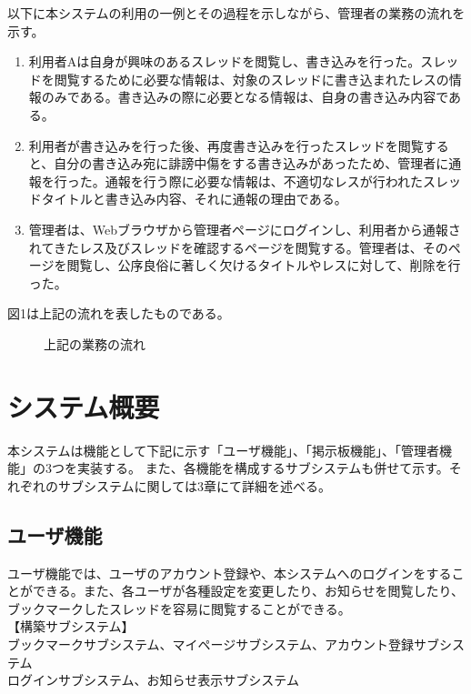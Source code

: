 \documentclass[a4j]{jarticle}
\begin{document}
以下に本システムの利用の一例とその過程を示しながら、管理者の業務の流れを示す。

\begin{enumerate}
  \item 利用者Aは自身が興味のあるスレッドを閲覧し、書き込みを行った。スレッドを閲覧するために必要な情報は、対象のスレッドに書き込まれたレスの情報のみである。書き込みの際に必要となる情報は、自身の書き込み内容である。

  \item  利用者が書き込みを行った後、再度書き込みを行ったスレッドを閲覧すると、自分の書き込み宛に誹謗中傷をする書き込みがあったため、管理者に通報を行った。通報を行う際に必要な情報は、不適切なレスが行われたスレッドタイトルと書き込み内容、それに通報の理由である。
  \item  管理者は、Webブラウザから管理者ページにログインし、利用者から通報されてきたレス及びスレッドを確認するページを閲覧する。管理者は、そのページを閲覧し、公序良俗に著しく欠けるタイトルやレスに対して、削除を行った。
\end{enumerate}

図1は上記の流れを表したものである。


\begin{figure}[h!]
\begin{center}
\caption{上記の業務の流れ}
\label{fig:figuretest}
\end{center}
\end{figure}














\section{システム概要}
本システムは機能として下記に示す「ユーザ機能」、「掲示板機能」、「管理者機能」の3つを実装する。
 また、各機能を構成するサブシステムも併せて示す。それぞれのサブシステムに関しては3章にて詳細を述べる。

\subsection{ユーザ機能}
 ユーザ機能では、ユーザのアカウント登録や、本システムへのログインをすることができる。また、各ユーザが各種設定を変更したり、お知らせを閲覧したり、ブックマークしたスレッドを容易に閲覧することができる。
\\【構築サブシステム】
\\ ブックマークサブシステム、マイページサブシステム、アカウント登録サブシステム
\\ ログインサブシステム、お知らせ表示サブシステム
\end{document}
